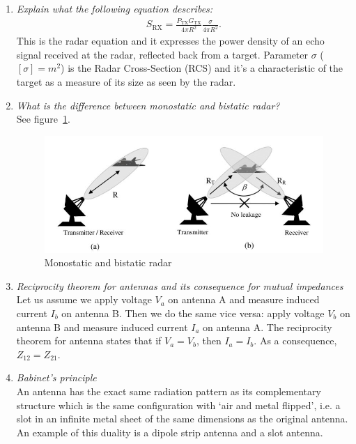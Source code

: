 \documentclass[11pt,a4paper]{article}
\begin{document}
\begin{enumerate}
    \item \emph{Explain what the following equation describes:}
    \begin{align*}
        S_{\mathrm{RX}} = \frac{P_{\mathrm{TX}}G_{\mathrm{TX}}}{4\pi R^2} \frac{\sigma}{4\pi R^2}.
    \end{align*}
    This is the radar equation and it expresses the power density of an echo signal received at the radar, reflected back from a target. Parameter $\sigma$ ($[\sigma] = m^2$) is the Radar Cross-Section (RCS) and it's a characteristic of the target as a measure of its size as seen by the radar.

    \item \emph{What is the difference between monostatic and bistatic radar?}\\
    See figure~\ref{fig:radar-types}.
    \begin{figure}[!ht]
        \centering
        \includegraphics[width=.7\textwidth]{src/radar-types.png}
        \caption{\label{fig:radar-types}Monostatic and bistatic radar}
    \end{figure}
    
    \item \emph{Reciprocity theorem for antennas and its consequence for mutual impedances}\\
    Let us assume we apply voltage $V_a$ on antenna A and measure induced current $I_b$ on antenna B. Then we do the same vice versa: apply voltage $V_b$ on antenna B and measure induced current $I_a$ on antenna A. The reciprocity theorem for antenna states that if $V_a=V_b$, then $I_a=I_b$. As a consequence, $Z_{12}=Z_{21}$.
    
    \item \emph{Babinet's principle}\\
    An antenna has the exact same radiation pattern as its complementary structure which is the same configuration with `air and metal flipped', i.e. a slot in an infinite metal sheet of the same dimensions as the original antenna. An example of this duality is a dipole strip antenna and a slot antenna.
    

\end{enumerate}
\end{document}
